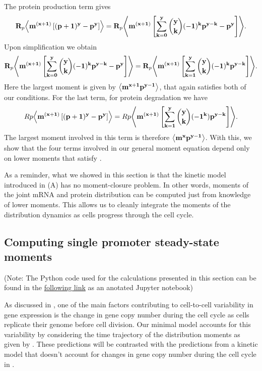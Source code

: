 The protein production term gives
\begin{equation}
  \mathbf{R}_p \mathbf{\left\langle m^{(x + 1)} \left[ (p + 1)^y - p^y \right] \right\rangle} =
  \mathbf{R}_p \mathbf{\left\langle m^{(x + 1)} \left[ \sum_{k=0}^y {y \choose k} (-1)^k p^{y-k}
                                - p^y \right] \right\rangle}.
\end{equation}
Upon simplification we obtain
\begin{equation}
  \mathbf{R}_p \mathbf{\left\langle m^{(x + 1)} \left[ \sum_{k=0}^y {y \choose k} (-1)^k p^{y-k}
                                - p^y \right] \right\rangle} =
  \mathbf{R}_p \mathbf{\left\langle m^{(x + 1)} \left[ \sum_{k=1}^y {y \choose k}(-1)^k p^{y-k}
  \right] \right\rangle}.
\end{equation}
Here the largest moment is given by $\mathbf{\left\langle m^{x+1} p^{y-1} \right\rangle}$, that again
satisfies both of our conditions. For the last term, for protein degradation we
have
\begin{equation}
  Rp \mathbf{\left\langle m^{(x + 1)} \left[ (p + 1)^y - p^y \right] \right\rangle} =
  Rp \mathbf{\left\langle m^{(x + 1)} \left[ \sum_{k=1}^y {y \choose k} (-1^k) p^{y - k}
  \right] \right\rangle}.
\end{equation}
The largest moment involved in this term is therefore $\mathbf{\left\langle m^x p^{y-1} \right\rangle}$.
With this, we show that the four terms involved in our general moment equation
depend only on lower moments that satisfy .

As a reminder, what we showed in this section is that the kinetic model
introduced in (A) has no moment-closure problem. In
other words, moments of the joint mRNA and protein distribution can be computed
just from knowledge of lower moments. This allows us to cleanly integrate the
moments of the distribution dynamics as cells progress through the cell cycle.

\subsection{Computing single promoter steady-state moments}

(Note: The Python code used for the calculations presented in this section can
be found in the
\href{https://www.rpgroup.caltech.edu//chann_cap/software/chemical_master_steady_state_moments_general.html}{following
link} as an anotated Jupyter notebook)

As discussed in , one of the main factors contributing to
cell-to-cell variability in gene expression is the change in gene copy number
during the cell cycle as cells replicate their genome before cell division. Our
minimal model accounts for this variability by considering the time trajectory
of the distribution moments as given by . These
predictions will be contrasted with the predictions from a kinetic model that
doesn't account for changes in gene copy number during the cell cycle in
.

